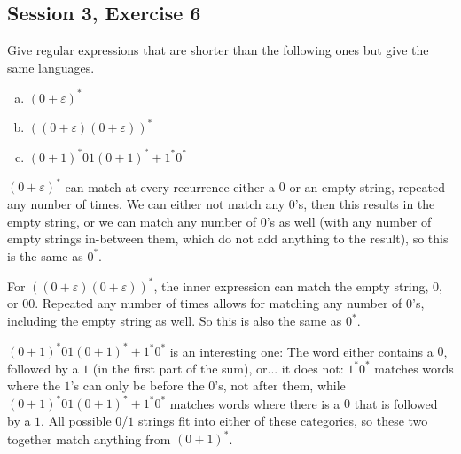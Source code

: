 \subsection{Session 3, Exercise 6}


Give regular expressions that are shorter than the following ones but give the same languages.

\begin{enumerate}[a.)]
\item $(0+\varepsilon)^*$
\item $((0+\varepsilon)(0+\varepsilon))^*$
\item $(0+1)^*01(0+1)^*+1^*0^*$
\end{enumerate}


$(0+\varepsilon)^*$ can match at every recurrence either a $0$ or an empty string, repeated any number of times. We can either not match any $0$'s, then this results in the empty string, or we can match any number of $0$'s as well (with any number of empty strings in-between them, which do not add anything to the result), so this is the same as $0^*$.

For $((0+\varepsilon)(0+\varepsilon))^*$, the inner expression can match the empty string, $0$, or $00$. Repeated any number of times allows for matching any number of $0$'s, including the empty string as well. So this is also the same as $0^*$.

$(0+1)^*01(0+1)^*+1^*0^*$ is an interesting one: The word either contains a $0$, followed by a $1$ (in the first part of the sum), or... it does not: $1^*0^*$ matches words where the $1$'s can only be before the $0$'s, not after them, while $(0+1)^*01(0+1)^*+1^*0^*$ matches words where there is a $0$ that is followed by a $1$. All possible $0$/$1$ strings fit into either of these categories, so these two together match anything from $(0+1)^*$.